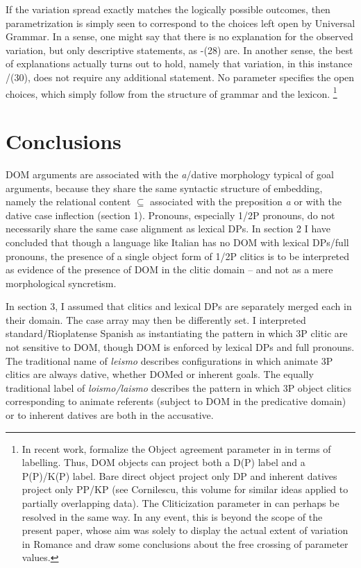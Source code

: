 \documentclass[output=paper]{langscibook}
\begin{document}
If the variation spread exactly matches the logically possible outcomes, then parametrization is simply seen to correspond to the choices left open by Universal Grammar. In a sense, one might say that there is no explanation for the observed variation, but only descriptive statements, as -(28) are. In another sense, the best of explanations actually turns out to hold, namely that variation, in this instance /(30), does not require any additional statement. No parameter specifies the open choices, which simply follow from the structure of grammar and the lexicon.{} \footnote{In recent work, \citet{ManziniFranco2019} formalize the Object agreement parameter in  in terms of labelling. Thus, DOM objects can project both a D(P) label and a P(P)/K(P) label. Bare direct object project only DP and inherent datives project only PP/KP (see Cornilescu, this volume for similar ideas applied to partially overlapping data). The Cliticization parameter in  can perhaps be resolved in the same way. In any event, this is beyond the scope of the present paper, whose aim was solely to display the actual extent of variation in Romance and draw some conclusions about the free crossing of parameter values.} 

\section{ Conclusions} %

DOM arguments are associated with the \textit{a}/dative morphology typical of goal arguments, because they share the same syntactic structure of embedding, namely the relational content ${\subseteq}$ associated with the preposition \textit{a} or with the dative case inflection (section 1). Pronouns, especially 1/2P pronouns, do not necessarily share the same case alignment as lexical DPs. In section 2 I have concluded that though a language like Italian has no DOM with lexical DPs/full pronouns, the presence of a single object form of 1/2P clitics is to be interpreted as evidence of the presence of DOM in the clitic domain – and not as a mere morphological syncretism.

In section 3, I assumed that clitics and lexical DPs are separately merged each in their domain. The case array may then be differently set. I interpreted standard/Rioplatense Spanish as instantiating the pattern in which 3P clitic are not sensitive to DOM, though DOM is enforced by lexical DPs and full pronouns. The traditional name of \textit{leismo} describes configurations in which animate 3P clitics are always dative, whether DOMed or inherent goals. The equally traditional label of \textit{loismo/laismo} describes the pattern in which 3P object clitics corresponding to animate referents (subject to DOM in the predicative domain) or to inherent datives are both in the accusative. 
\end{document}
